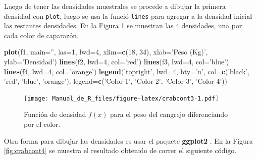 \documentclass[10pt,]{krantz}
\makeatletter
\newenvironment{Shaded}{\begin{snugshade}}{\end{snugshade}}
\newcommand{\KeywordTok}[1]{\textcolor[rgb]{0.13,0.29,0.53}{\textbf{{#1}}}}
\newcommand{\DataTypeTok}[1]{\textcolor[rgb]{0.13,0.29,0.53}{{#1}}}
\newcommand{\DecValTok}[1]{\textcolor[rgb]{0.00,0.00,0.81}{{#1}}}
\newcommand{\StringTok}[1]{\textcolor[rgb]{0.31,0.60,0.02}{{#1}}}
\newcommand{\NormalTok}[1]{{#1}}
\newenvironment{kframe}{%
\medskip{}
\setlength{\fboxsep}{.8em}
 \def\at@end@of@kframe{}%
 \ifinner\ifhmode%
  \def\at@end@of@kframe{\end{minipage}}%
  \begin{minipage}{\columnwidth}%
 \fi\fi%
 \def\FrameCommand##1{\hskip\@totalleftmargin \hskip-\fboxsep
 \colorbox{shadecolor}{##1}\hskip-\fboxsep
     \hskip-\linewidth \hskip-\@totalleftmargin \hskip\columnwidth}%
 \MakeFramed {\advance\hsize-\width
   \@totalleftmargin\z@ \linewidth\hsize
   \@setminipage}}%
 {\par\unskip\endMakeFramed%
 \at@end@of@kframe}
\renewenvironment{Shaded}{\begin{kframe}}{\end{kframe}}
\makeatother
\begin{document}
Luego de tener las densidades muestrales se procede a dibujar la primera
densidad con \texttt{plot}, luego se usa la funció \texttt{lines} para
agregar a la densidad inicial las restantes densidades. En la Figura
\ref{fig:crabcont3} se muestran las 4 densidades, una por cada color de
caparazón.

\begin{Shaded}
\begin{Highlighting}[]
\KeywordTok{plot}\NormalTok{(f1, }\DataTypeTok{main=}\StringTok{''}\NormalTok{, }\DataTypeTok{las=}\DecValTok{1}\NormalTok{, }\DataTypeTok{lwd=}\DecValTok{4}\NormalTok{,}
     \DataTypeTok{xlim=}\KeywordTok{c}\NormalTok{(}\DecValTok{18}\NormalTok{, }\DecValTok{34}\NormalTok{),}
     \DataTypeTok{xlab=}\StringTok{'Peso (Kg)'}\NormalTok{, }\DataTypeTok{ylab=}\StringTok{'Densidad'}\NormalTok{)}
\KeywordTok{lines}\NormalTok{(f2, }\DataTypeTok{lwd=}\DecValTok{4}\NormalTok{, }\DataTypeTok{col=}\StringTok{'red'}\NormalTok{)}
\KeywordTok{lines}\NormalTok{(f3, }\DataTypeTok{lwd=}\DecValTok{4}\NormalTok{, }\DataTypeTok{col=}\StringTok{'blue'}\NormalTok{)}
\KeywordTok{lines}\NormalTok{(f4, }\DataTypeTok{lwd=}\DecValTok{4}\NormalTok{, }\DataTypeTok{col=}\StringTok{'orange'}\NormalTok{)}
\KeywordTok{legend}\NormalTok{(}\StringTok{'topright'}\NormalTok{, }\DataTypeTok{lwd=}\DecValTok{4}\NormalTok{, }\DataTypeTok{bty=}\StringTok{'n'}\NormalTok{,}
       \DataTypeTok{col=}\KeywordTok{c}\NormalTok{(}\StringTok{'black'}\NormalTok{, }\StringTok{'red'}\NormalTok{, }\StringTok{'blue'}\NormalTok{, }\StringTok{'orange'}\NormalTok{),}
       \DataTypeTok{legend=}\KeywordTok{c}\NormalTok{(}\StringTok{'Color 1'}\NormalTok{, }\StringTok{'Color 2'}\NormalTok{, }\StringTok{'Color 3'}\NormalTok{, }\StringTok{'Color 4'}\NormalTok{))}
\end{Highlighting}
\end{Shaded}

\begin{figure}[htbp]
\centering
\texttt{[image: Manual\_de\_R\_files/figure-latex/crabcont3-1.pdf]}
\caption{\label{fig:crabcont3}Función de densidad \(f(x)\) para el peso del
cangrejo diferenciando por el color.}
\end{figure}

Otra forma para dibujar las densidades es usar el paquete
\textbf{ggplot2} \citep{R-ggplot2}. En la Figura \ref{fig:crabcont4} se
muestra el resultado obtenido de correr el siguiente código.
\end{document}
